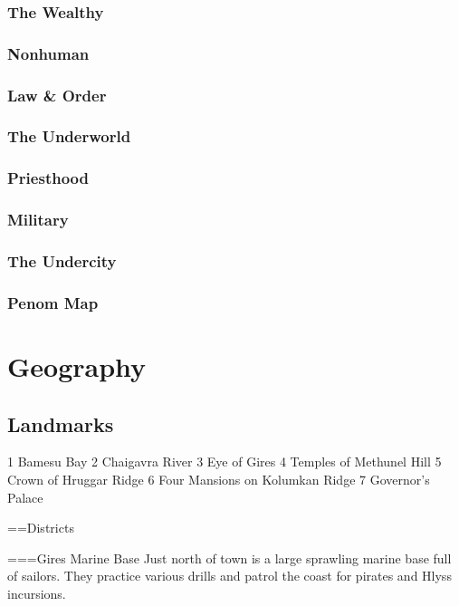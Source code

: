 \subsubsection{The Wealthy}

\subsubsection{Nonhuman}

\subsubsection{Law \& Order}

\subsubsection{The Underworld}

\subsubsection{Priesthood}

\subsubsection{Military}

\subsubsection{The Undercity}

\subsubsection{Penom Map}

\section{Geography}

\subsection{Landmarks}

1 Bamesu Bay
2 Chaigavra River
3 Eye of Gires
4 Temples of Methunel Hill
5 Crown of Hruggar Ridge
6 Four Mansions on Kolumkan Ridge
7 Governor's Palace

==Districts

===Gires Marine Base
Just north of town is a large sprawling marine base full of sailors. They practice various drills and patrol the coast for pirates and Hlyss incursions.


